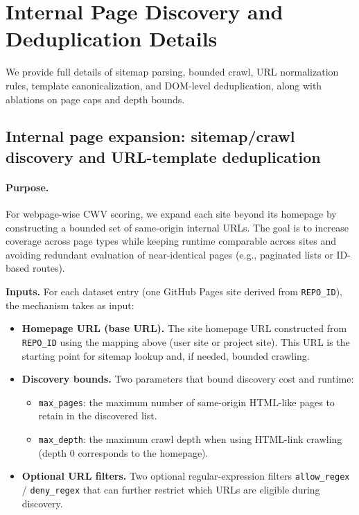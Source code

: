 \section{Internal Page Discovery and Deduplication Details}
\label{app:page_dedup}

We provide full details of sitemap parsing, bounded crawl, URL normalization rules, template canonicalization, and DOM-level deduplication, along with ablations on page caps and depth bounds.


\subsection{Internal page expansion: sitemap/crawl discovery and URL-template deduplication}
\label{app:internal-page-discovery}

\paragraph{Purpose.}
For webpage-wise CWV scoring, we expand each site beyond its homepage by constructing a bounded set of same-origin internal URLs. The goal is to increase coverage across page types while keeping runtime comparable across sites and avoiding redundant evaluation of near-identical pages (e.g., paginated lists or ID-based routes).


\noindent\textbf{Inputs.}
For each dataset entry (one GitHub Pages site derived from \texttt{REPO\_ID}), the mechanism takes as input:
\begin{itemize}
    \item \textbf{Homepage URL (base URL).} The site homepage URL constructed from \texttt{REPO\_ID} using the mapping above (user site or project site). This URL is the starting point for sitemap lookup and, if needed, bounded crawling.
    \item \textbf{Discovery bounds.} Two parameters that bound discovery cost and runtime:
    \begin{itemize}
        \item \texttt{max\_pages}: the maximum number of same-origin HTML-like pages to retain in the discovered list.
        \item \texttt{max\_depth}: the maximum crawl depth when using HTML-link crawling (depth 0 corresponds to the homepage).
    \end{itemize}
    \item \textbf{Optional URL filters.} Two optional regular-expression filters \texttt{allow\_regex} / \texttt{deny\_regex} that can further restrict which URLs are eligible during discovery.
\end{itemize}

